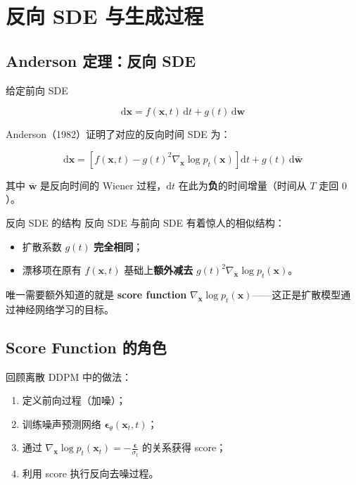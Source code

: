 \section{反向 SDE 与生成过程}

\subsection{Anderson 定理：反向 SDE}

给定前向 SDE

$$
\mathrm{d}\mathbf{x} = f(\mathbf{x}, t)\,\mathrm{d}t + g(t)\,\mathrm{d}\mathbf{w}
$$

Anderson（1982）证明了对应的反向时间 SDE 为：

$$
\mathrm{d}\mathbf{x} = \left[f(\mathbf{x}, t) - g(t)^2 \nabla_{\mathbf{x}} \log p_t(\mathbf{x})\right]\mathrm{d}t + g(t)\,\mathrm{d}\bar{\mathbf{w}}
$$

其中 $\bar{\mathbf{w}}$ 是反向时间的 Wiener 过程，$\mathrm{d}t$ 在此为\textbf{负}的时间增量（时间从 $T$ 走回 $0$）。

\begin{importantbox}{反向 SDE 的结构}
反向 SDE 与前向 SDE 有着惊人的相似结构：
\begin{itemize}
    \item 扩散系数 $g(t)$ \textbf{完全相同}；
    \item 漂移项在原有 $f(\mathbf{x}, t)$ 基础上\textbf{额外减去} $g(t)^2 \nabla_{\mathbf{x}} \log p_t(\mathbf{x})$。
\end{itemize}
唯一需要额外知道的就是 \textbf{score function} $\nabla_{\mathbf{x}} \log p_t(\mathbf{x})$——这正是扩散模型通过神经网络学习的目标。
\end{importantbox}

\subsection{Score Function 的角色}

回顾离散 DDPM 中的做法：
\begin{enumerate}
    \item 定义前向过程（加噪）；
    \item 训练噪声预测网络 $\boldsymbol{\epsilon}_\theta(\mathbf{x}_t, t)$；
    \item 通过 $\nabla_{\mathbf{x}} \log p_t(\mathbf{x}_t) = -\frac{\boldsymbol{\epsilon}}{\sigma_t}$ 的关系获得 score；
    \item 利用 score 执行反向去噪过程。
\end{enumerate}

